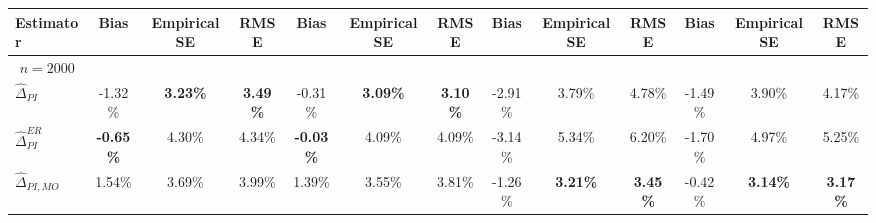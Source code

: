 \documentclass{article}
\begin{document}
\begin{landscape}
\begin{table}[]
{\begin{tabular}{l|lll|lll|lll|lll}
Estimator                         & \multicolumn{1}{c}{Bias}                    & \multicolumn{1}{c}{Empirical SE}                                & \multicolumn{1}{c|}{RMSE}              & \multicolumn{1}{c}{Bias}                    & \multicolumn{1}{c}{Empirical SE}                                & \multicolumn{1}{c|}{RMSE}              & \multicolumn{1}{c}{Bias}                    & \multicolumn{1}{c}{Empirical SE}                                & \multicolumn{1}{c|}{RMSE}              & \multicolumn{1}{c}{Bias}                    & \multicolumn{1}{c}{Empirical SE}                                & \multicolumn{1}{c}{RMSE}              \\ \hline 
\multicolumn{1}{c|}{$n= 2000 $}          &                                             &                                                                 &                                        &                                             &                                                                 &                                        &                                             &                                                                 &                                        &                                             &                                                                 &                                       \\ 
$\widehat{\Delta}_{PI}$           &\multicolumn{1}{c}{ -1.32\% }&\multicolumn{1}{c}{ \textbf{3.23\%} }&\multicolumn{1}{c|}{ \textbf{3.49\%} }&\multicolumn{1}{c}{ -0.31\% }&\multicolumn{1}{c}{ \textbf{3.09\%} }&\multicolumn{1}{c|}{ \textbf{3.10\%} }&\multicolumn{1}{c}{ -2.91\% }&\multicolumn{1}{c}{ 3.79\% }&\multicolumn{1}{c|}{ 4.78\% }&\multicolumn{1}{c}{ -1.49\% }&\multicolumn{1}{c}{ 3.90\% }&\multicolumn{1}{c}{ 4.17\% }\\ 
$\widehat{\Delta}_{PI}^{ER}$      &\multicolumn{1}{c}{ \textbf{-0.65\%} }&\multicolumn{1}{c}{ 4.30\% }&\multicolumn{1}{c|}{ 4.34\% }&\multicolumn{1}{c}{ \textbf{-0.03\%} }&\multicolumn{1}{c}{ 4.09\% }&\multicolumn{1}{c|}{ 4.09\% }&\multicolumn{1}{c}{ -3.14\% }&\multicolumn{1}{c}{ 5.34\% }&\multicolumn{1}{c|}{ 6.20\% }&\multicolumn{1}{c}{ -1.70\% }&\multicolumn{1}{c}{ 4.97\% }&\multicolumn{1}{c}{ 5.25\% }\\ 
$\widehat{\Delta}_{PI,MO}$        &\multicolumn{1}{c}{ 1.54\% }&\multicolumn{1}{c}{ 3.69\% }&\multicolumn{1}{c|}{ 3.99\% }&\multicolumn{1}{c}{ 1.39\% }&\multicolumn{1}{c}{ 3.55\% }&\multicolumn{1}{c|}{ 3.81\% }&\multicolumn{1}{c}{ -1.26\% }&\multicolumn{1}{c}{ \textbf{3.21\%} }&\multicolumn{1}{c|}{ \textbf{3.45\%} }&\multicolumn{1}{c}{ -0.42\% }&\multicolumn{1}{c}{ \textbf{3.14\%} }&\multicolumn{1}{c}{ \textbf{3.17\%} }\\ 

\end{tabular}}
\end{table}
\end{landscape}
\end{document}
